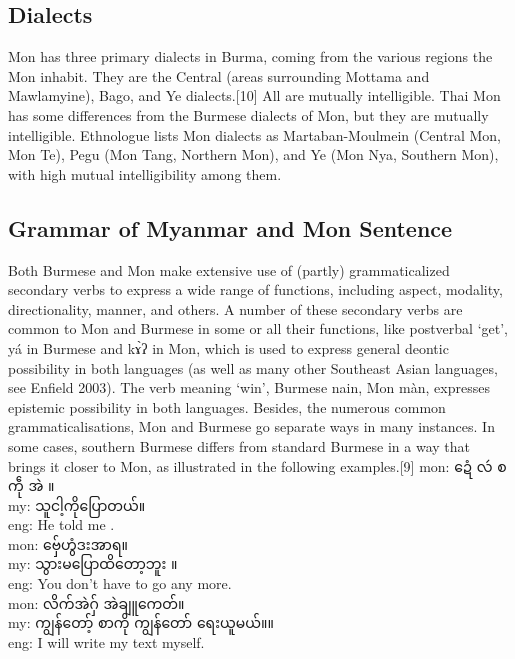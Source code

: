 \documentclass[conference]{IEEEtran}
\begin{document}
\subsection{Dialects}
\label{subsec:Mon Dialects}
Mon has three primary dialects in Burma, coming from the various regions the Mon inhabit. They are the Central (areas surrounding Mottama and Mawlamyine), Bago, and Ye dialects.[10] All are mutually intelligible. Thai Mon has some differences from the Burmese dialects of Mon, but they are mutually intelligible. Ethnologue lists Mon dialects as Martaban-Moulmein (Central Mon, Mon Te), Pegu (Mon Tang, Northern Mon), and Ye (Mon Nya, Southern Mon), with high mutual intelligibility among them.\cite{b3}

\subsection{Grammar of Myanmar and Mon Sentence}
\label{subsecsec:Grammar}
Both Burmese and Mon make extensive use of (partly) grammaticalized secondary verbs to express a wide range of functions, including aspect, modality, directionality, manner, and others. A number of these secondary verbs are common to Mon and Burmese in some or all their functions, like postverbal ‘get’, yá in Burmese and kɤ̀ʔ in Mon, which is used to express general deontic possibility in both languages (as well as many other Southeast Asian languages, see Enfield 2003). The verb meaning ‘win’, Burmese nain, Mon màn, expresses epistemic possibility in both languages. Besides, the numerous common grammaticalisations, Mon and Burmese go separate ways in many instances. In some cases, southern Burmese differs from standard Burmese in a way that brings it closer to Mon, as illustrated in the following examples.[9]
\noindent mon: {\padauktext ဍေံ လဴ စကဵု အဲ ။}\\
my:  {\padauktext သူငါ့ကိုပြောတယ်။}\\
eng: He told me .\\

\noindent mon: {\padauktext ဗှ်ေဟွံဒးအာရ။}\\
my:  {\padauktext သွားမပြောထိတော့ဘူး ။}\\
eng: You don’t have to go any more.\\

\noindent mon: {\padauktext လိက်အဲဂှ် အဲချူကေတ်။}\\
my:  {\padauktext ကျွန်တော့် စာကို ကျွန်တော် ရေးယူမယ်။။}\\
eng: I will write my text myself. \\
\end{document}
